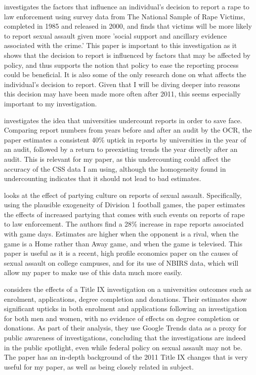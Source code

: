 \documentclass[AER,draftmode]{AEA}
\begin{document}
 investigates the factors that influence an individual's decision to report a rape to law enforcement using survey data from The National Sample of Rape Victims, completed in 1985 and released in 2000, and finds that victims will be more likely to report sexual assault given more 'social support and ancillary evidence associated with the crime.' This paper is important to this investigation as it shows that the decision to report is influenced by factors that may be affected by policy, and thus supports the notion that policy to ease the reporting process could be beneficial. It is also some of the only research done on what affects the individual's decision to report. Given that I will be diving deeper into reasons this decision may have been made more often after 2011, this seems especially important to my investigation.

 investigates the idea that universities undercount reports in order to save face.  Comparing report numbers from years before and after an audit by the OCR, the paper estimates a consistent 40\% uptick in reports by universities in the year of an audit, followed by a return to preexisting trends the year directly after an audit. This is relevant for my paper, as this undercounting could affect the accuracy of the CSS data I am using, although the homogeneity found in undercounting indicates that it should not lead to bad estimates.

 looks at the effect of partying culture on reports of sexual assault. Specifically, using the plausible exogeneity of Division 1 football games, the paper estimates the effects of increased partying that comes with such events on reports of rape to law enforcement. The authors find a 28\% increase in rape reports associated with game days. Estimates are higher when the opponent is a rival, when the game is a Home rather than Away game, and when the game is televised. This paper is useful as it is a recent, high profile economics paper on the causes of sexual assault on college campuses, and for its use of NBIRS data, which will allow my paper to make use of this data much more easily.

 considers the effects of a Title IX investigation on a universities outcomes such as enrolment, applications, degree completion and donations. Their estimates show significant upticks in both enrolment and applications following an investigation for both men and women, with no evidence of effects on degree completion or donations. As part of their analysis, they use Google Trends data as a proxy for public awareness of investigations, concluding that the investigations are indeed in the public spotlight, even while federal policy on sexual assault may not be. The paper has an in-depth background of the 2011 Title IX changes that is very useful for my paper, as well as being closely related in subject. 
\end{document}
